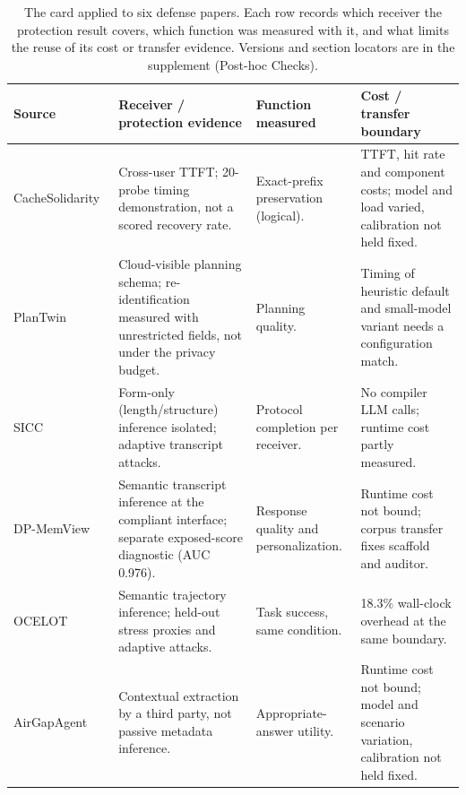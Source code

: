 \begin{table}[t]\centering\footnotesize
\caption{The card applied to six defense papers. Each row records which receiver the protection result covers, which function was measured with it, and what limits the reuse of its cost or transfer evidence. Versions and section locators are in the supplement (Post-hoc Checks).}\label{tab:r42-defense-first}
\setlength{\tabcolsep}{3pt}
\begin{tabularx}{\textwidth}{@{}p{}p{}p{}Y@{}}\toprule
Source & Receiver / protection evidence & Function measured & Cost / transfer boundary\\\midrule
CacheSolidarity~\cite{pennas2026cachesolidarity} & Cross-user TTFT; 20-probe timing demonstration, not a scored recovery rate. & Exact-prefix preservation (logical). & TTFT, hit rate and component costs; model and load varied, calibration not held fixed.\\
PlanTwin~\cite{yu2026plantwin} & Cloud-visible planning schema; re-identification measured with unrestricted fields, not under the privacy budget. & Planning quality. & Timing of heuristic default and small-model variant needs a configuration match.\\
SICC~\cite{xu2026sicc} & Form-only (length/structure) inference isolated; adaptive transcript attacks. & Protocol completion per receiver. & No compiler LLM calls; runtime cost partly measured.\\
DP-MemView~\cite{dpmemview2026} & Semantic transcript inference at the compliant interface; separate exposed-score diagnostic (AUC 0.976). & Response quality and personalization. & Runtime cost not bound; corpus transfer fixes scaffold and auditor.\\
OCELOT~\cite{xie2026ocelot} & Semantic trajectory inference; held-out stress proxies and adaptive attacks. & Task success, same condition. & 18.3\% wall-clock overhead at the same boundary.\\
AirGapAgent~\cite{bagdasarian2024airgap} & Contextual extraction by a third party, not passive metadata inference. & Appropriate-answer utility. & Runtime cost not bound; model and scenario variation, calibration not held fixed.\\
\bottomrule\end{tabularx}
\end{table}
